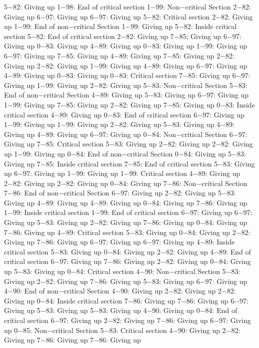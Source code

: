 5−82: Giving up
1−98: End of critical section
1−99: Non−critical Section
2−82: Giving up
6−97: Giving up
6−97: Giving up
5−82: Critical section
2−82: Giving up
1−99: End of non−critical Section
1−99: Giving up
5−82: Inside critical section
5−82: End of critical section
2−82: Giving up
7−85: Giving up
6−97: Giving up
0−83: Giving up
4−89: Giving up
0−83: Giving up
1−99: Giving up
6−97: Giving up
7−85: Giving up
4−89: Giving up
7−85: Giving up
2−82: Giving up
2−82: Giving up
1−99: Giving up
4−89: Giving up
6−97: Giving up
4−89: Giving up
0−83: Giving up
0−83: Critical section
7−85: Giving up
6−97: Giving up
1−99: Giving up
2−82: Giving up
5−83: Non−critical Section
5−83: End of non−critical Section
4−89: Giving up
5−83: Giving up
6−97: Giving up
1−99: Giving up
7−85: Giving up
2−82: Giving up
7−85: Giving up
0−83: Inside critical section
4−89: Giving up
0−83: End of critical section
6−97: Giving up
1−99: Giving up
1−99: Giving up
2−82: Giving up
5−83: Giving up
4−89: Giving up
4−89: Giving up
6−97: Giving up
0−84: Non−critical Section
6−97: Giving up
7−85: Critical section
5−83: Giving up
2−82: Giving up
2−82: Giving up
1−99: Giving up
0−84: End of non−critical Section
0−84: Giving up
5−83: Giving up
7−85: Inside critical section
7−85: End of critical section
5−83: Giving up
6−97: Giving up
1−99: Giving up
1−99: Critical section
4−89: Giving up
2−82: Giving up
2−82: Giving up
0−84: Giving up
7−86: Non−critical Section
7−86: End of non−critical Section
6−97: Giving up
2−82: Giving up
5−83: Giving up
4−89: Giving up
4−89: Giving up
0−84: Giving up
7−86: Giving up
1−99: Inside critical section
1−99: End of critical section
6−97: Giving up
6−97: Giving up
5−83: Giving up
2−82: Giving up
7−86: Giving up
0−84: Giving up
7−86: Giving up
4−89: Critical section
5−83: Giving up
0−84: Giving up
2−82: Giving up
7−86: Giving up
6−97: Giving up
6−97: Giving up
4−89: Inside critical section
5−83: Giving up
0−84: Giving up
2−82: Giving up
4−89: End of critical section
6−97: Giving up
7−86: Giving up
2−82: Giving up
0−84: Giving up
5−83: Giving up
0−84: Critical section
4−90: Non−critical Section
5−83: Giving up
2−82: Giving up
7−86: Giving up
5−83: Giving up
6−97: Giving up
4−90: End of non−critical Section
4−90: Giving up
2−82: Giving up
2−82: Giving up
0−84: Inside critical section
7−86: Giving up
7−86: Giving up
6−97: Giving up
5−83: Giving up
5−83: Giving up
4−90: Giving up
0−84: End of critical section
6−97: Giving up
2−82: Giving up
7−86: Giving up
6−97: Giving up
0−85: Non−critical Section
5−83: Critical section
4−90: Giving up
2−82: Giving up
7−86: Giving up
7−86: Giving up
